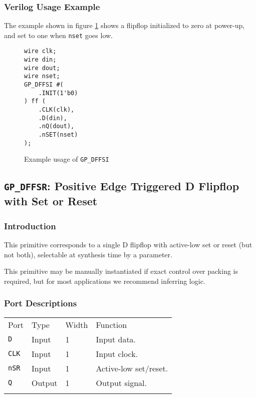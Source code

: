 \documentclass[11pt]{article}
\newcommand{\tokenstyle}[1]{\texttt{#1}}
\newcommand{\wirestyle}[1]{\texttt{#1}}
\newcommand{\whenstyle}[1]{{\fontseries{sb}\selectfont#1}}
\newcommand{\thinhline}{\Xhline{1\arrayrulewidth}}
\newcommand{\thickhline}{\Xhline{2.5\arrayrulewidth}}
\begin{document}
\subsubsection{Verilog Usage Example}

The example shown in figure \ref{gp-dffsi-example} shows a flipflop initialized to zero at power-up, and set to one
when \wirestyle{nset} goes low.

\begin{figure}[h]
\begin{lstlisting}
wire clk;
wire din;
wire dout;
wire nset;
GP_DFFSI #(
	.INIT(1'b0)
) ff (
	.CLK(clk),
	.D(din),
	.nQ(dout),
	.nSET(nset)
);
\end{lstlisting}
\caption{Example usage of \tokenstyle{GP\_DFFSI}}
\label{gp-dffsi-example}
\end{figure}


\pagebreak
\subsection{\tokenstyle{GP\_DFFSR}: Positive Edge Triggered D Flipflop with Set or Reset}
\label{gp-dffsr}

\subsubsection{Introduction}
This primitive corresponds to a single D flipflop with active-low set or reset (but not both), selectable at synthesis
time by a parameter.

This primitive may be manually instantiated if exact control over packing is required, but for most applications we
recommend inferring logic.

\subsubsection{Port Descriptions}

\begin{tabularx}{\textwidth}{lllX}
\thinhline
\whenstyle{Port} & \whenstyle{Type} & \whenstyle{Width} & \whenstyle{Function} \\
\thickhline
\tokenstyle{D} & Input & 1 & Input data. \\
\thinhline
\tokenstyle{CLK} & Input & 1 & Input clock. \\
\thinhline
\tokenstyle{nSR} & Input & 1 & Active-low set/reset. \\
\thinhline
\tokenstyle{Q} & Output & 1 & Output signal. \\
\thinhline
\end{tabularx}
\end{document}
